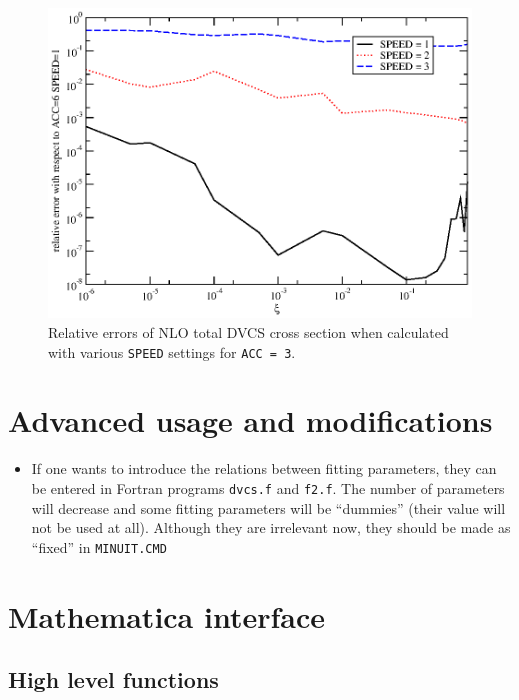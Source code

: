 \documentclass[12pt]{article}
\begin{document}
\begin{figure}
\begin{center}
\includegraphics[scale=0.8]{acc}
\end{center}
\caption{Relative errors of NLO total DVCS cross section when calculated with various
\texttt{SPEED} settings for \texttt{ACC = 3}.}
\label{fig:acc}
\end{figure}


\section{Advanced usage and modifications}

\begin{itemize}
\item If one wants to introduce the relations between fitting parameters, they
can be entered in Fortran programs \texttt{dvcs.f} and \texttt{f2.f}.
The number of parameters will decrease and some fitting parameters 
will be ``dummies'' (their value will not be used at all). 
Although they are irrelevant now, they should be made as
``fixed'' in \texttt{MINUIT.CMD}
\end{itemize}



\section{Mathematica interface}
\label{sec:mma}


\subsection{High level functions}
\end{document}
